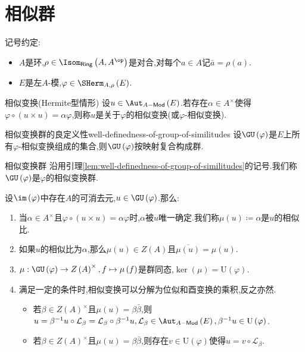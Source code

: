 \section{相似群}

记号约定:
\begin{itemize}
	\item $A$是环,$\rho\in\Isom_{\mathsf{Ring}}\left(A,A^{\op}\right)$是对合,对每个$a\in A$记$\bar{a}=\rho\left(a\right)$.
	\item $E$是左$A$-模,$\varphi\in\SHerm_{A,\rho}\left(E\right)$.
\end{itemize}

\begin{definition}{相似变换(Hermite型情形)}{}
	设$u\in\Aut_{A-\mathsf{Mod}}\left(E\right)$.若存在$\alpha\in A^{\times}$使得$\varphi\circ\left(u\times u\right)=\alpha\varphi$,则称$u$是关于$\varphi$的相似变换(或$\varphi$-相似变换).
\end{definition}

\begin{lemma}{相似变换群的良定义性}{well-definedness-of-group-of-similitudes}
	设$\GU\left(\varphi\right)$是$E$上所有$\varphi$-相似变换组成的集合,则$\GU\left(\varphi\right)$按映射复合构成群.
\end{lemma}

\begin{definition}{相似变换群}{}
	沿用引理\ref{lem:well-definedness-of-group-of-similitudes}的记号.我们称$\GU\left(\varphi\right)$是$\varphi$的相似变换群.
\end{definition}

\begin{remark}{}{}
	设$\im\left(\varphi\right)$中存在$A$的可消去元,$u\in\GU\left(\varphi\right)$.那么:
	\begin{enumerate}
		\item 当$\alpha\in A^{\times}$且$\varphi\circ\left(u\times u\right)=\alpha\varphi$时,$\alpha$被$u$唯一确定.我们称$\mu\left(u\right)\coloneq\alpha$是$u$的相似比.
		\item 如果$u$的相似比为$\alpha$,那么$\mu\left(u\right)\in Z\left(A\right)$且$\overline{\mu\left(u\right)}=\mu\left(u\right)$.
		\item $\mu:\GU\left(\varphi\right)\to Z\left(A\right)^{\times},f\mapsto\mu\left(f\right)$是群同态,$\ker\left(\mu\right)=\mathrm{U}\left(\varphi\right)$.
		\item 满足一定的条件时,相似变换可以分解为位似和酉变换的乘积,反之亦然.
		\begin{itemize}
			\item 若$\beta\in Z\left(A\right)^{\times}$且$\mu\left(u\right)=\beta\bar{\beta}$,则$u=\beta^{-1}u\circ\mathcal{L}_{\beta}=\mathcal{L}_{\beta}\circ\beta^{-1}u,\mathcal{L}_{\beta}\in\Aut_{A-\mathsf{Mod}}\left(E\right),\beta^{-1}u\in\mathrm{U}\left(\varphi\right)$.
			\item 若$\beta\in Z\left(A\right)^{\times}$且$\mu\left(u\right)=\beta\bar{\beta}$,则存在$v\in\mathrm{U}\left(\varphi\right)$使得$u=v\circ\mathcal{L}_{\beta}$.
		\end{itemize}
	\end{enumerate}
\end{remark}

